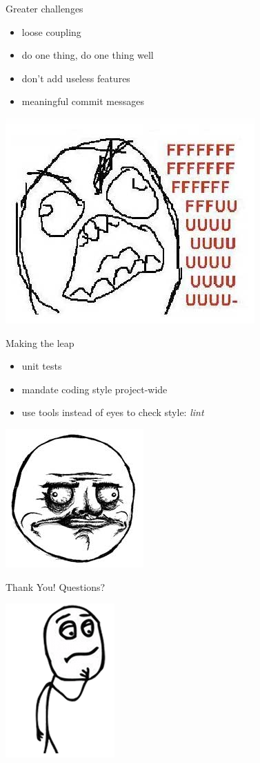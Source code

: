 \documentclass{beamer}
\begin{document}
\begin{frame}{Greater challenges}
  \begin{itemize}
    \pause
    \item loose coupling
    \pause
    \item do one thing, do one thing well
    \pause
    \item don't add useless features
    \pause
    \item meaningful commit messages
  \end{itemize}
  \pause
  \begin{center}
    \includegraphics[scale=0.3]{img/fuuu}
  \end{center}
\end{frame}

\begin{frame}{Making the leap}
  \begin{itemize}
    \pause
    \item unit tests
    \pause
    \item mandate coding style project-wide
    \pause
    \item use tools instead of eyes to check style: \emph{lint}
    \pause
  \end{itemize}
  \begin{center}
    \includegraphics[scale=0.6]{img/megusta}
  \end{center}
\end{frame}

\begin{frame}{Thank You!}
  \pause
  \Huge Questions?
  \begin{center}
    \includegraphics[scale=0.6]{img/conflicting}
  \end{center}
\end{frame}
\end{document}
